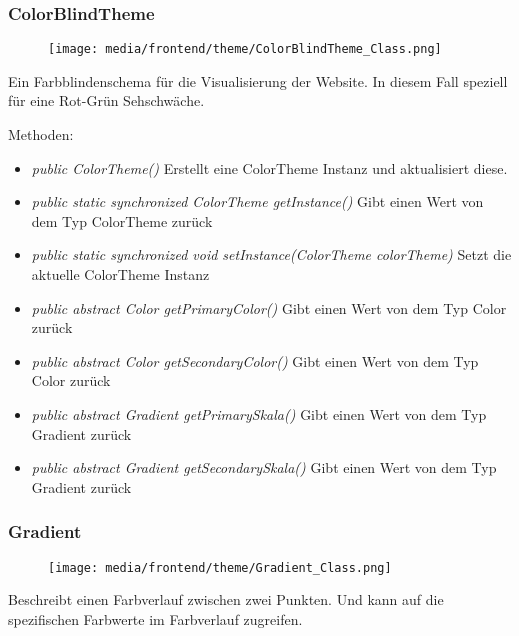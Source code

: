 \begin{itemize}
\subsubsection{ColorBlindTheme}
\begin{minipage}{0.3\textwidth}
\begin{figure}[H]
    \texttt{[image: media/frontend/theme/ColorBlindTheme\_Class.png]}
\end{figure}
\end{minipage} \hfill
\begin{minipage}{0.6\textwidth}
    Ein Farbblindenschema für die Visualisierung der Website. In diesem Fall speziell für eine Rot-Grün Sehschwäche.
\end{minipage}

Methoden:
\begin{itemize} 
    \item \emph{public ColorTheme()} Erstellt eine ColorTheme Instanz und aktualisiert diese.
    \item \emph{public static synchronized ColorTheme getInstance()} Gibt einen Wert von dem Typ ColorTheme zurück
    \item \emph{public static synchronized void setInstance(ColorTheme colorTheme)} Setzt die aktuelle ColorTheme Instanz
    \item \emph{public abstract Color getPrimaryColor()} Gibt einen Wert von dem Typ Color zurück
    \item \emph{public abstract Color getSecondaryColor()} Gibt einen Wert von dem Typ Color zurück
    \item \emph{public abstract Gradient getPrimarySkala()} Gibt einen Wert von dem Typ Gradient zurück
    \item \emph{public abstract Gradient getSecondarySkala()}  Gibt einen Wert von dem Typ Gradient zurück
\end{itemize}

\subsubsection{Gradient} 
\begin{minipage}{0.3\textwidth}
    \begin{figure}[H]
    \texttt{[image: media/frontend/theme/Gradient\_Class.png]}
    \end{figure}
    \end{minipage} \hfill
    \begin{minipage}{0.6\textwidth}
    Beschreibt einen Farbverlauf zwischen zwei Punkten. Und kann auf die spezifischen Farbwerte im Farbverlauf zugreifen.
    \end{minipage}


\end{itemize}
